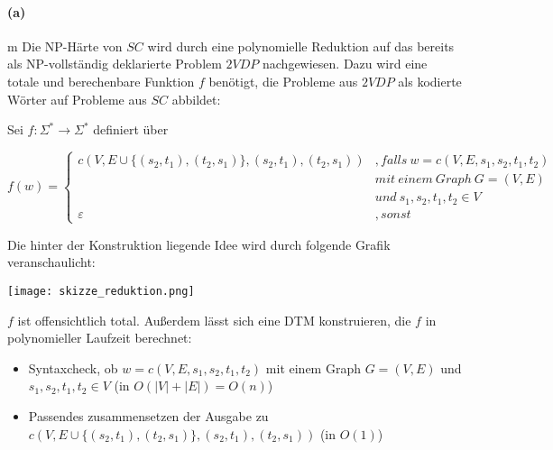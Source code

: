 
\paragraph{(a)}m
	Die NP-Härte von $SC$ wird durch eine polynomielle Reduktion auf das bereits als NP-vollständig deklarierte Problem $2VDP$ nachgewiesen. Dazu wird eine totale und berechenbare Funktion $f$ benötigt, die Probleme aus $2VDP$ als kodierte Wörter auf Probleme aus $SC$ abbildet:

	Sei $f:\Sigma^*\rightarrow \Sigma^*$ definiert über

	$f(w)=\begin{cases}
		c(V,E\cup \{(s_2,t_1),(t_2,s_1)\},(s_2,t_1),(t_2,s_1))&, falls\ w=c(V,E,s_1,s_2,t_1,t_2)\\
		&mit\ einem\ Graph\ G=(V,E)\\
		&und\ s_1,s_2,t_1,t_2 \in V\\
		\varepsilon &, sonst
	\end{cases}$

	Die hinter der Konstruktion liegende Idee wird durch folgende Grafik veranschaulicht:

	\texttt{[image: skizze\_reduktion.png]}
	
	$f$ ist offensichtlich total. Außerdem lässt sich eine DTM konstruieren, die $f$ in polynomieller Laufzeit berechnet:
	\begin{itemize}
		\item Syntaxcheck, ob $w=c(V,E,s_1,s_2,t_1,t_2)$ mit einem Graph $G=(V,E)$ und $s_1,s_2,t_1,t_2 \in V$ (in $O(|V|+|E|)=O(n)$)
		\item Passendes zusammensetzen der Ausgabe zu $c(V,E\cup \{(s_2,t_1),(t_2,s_1)\},(s_2,t_1),(t_2,s_1))$ (in $O(1)$)
	\end{itemize}

